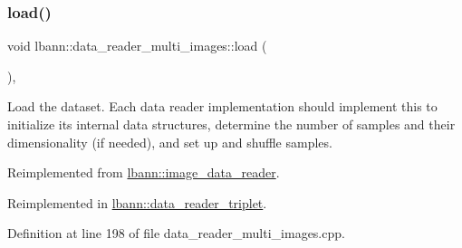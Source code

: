 \subsubsection{\texorpdfstring{load()}{load()}}
{\footnotesize\ttfamily void lbann\+::data\+\_\+reader\+\_\+multi\+\_\+images\+::load (\begin{DoxyParamCaption}{ }\end{DoxyParamCaption})\hspace{0.3cm}{\ttfamily [override]}, {\ttfamily [virtual]}}

Load the dataset. Each data reader implementation should implement this to initialize its internal data structures, determine the number of samples and their dimensionality (if needed), and set up and shuffle samples. 

Reimplemented from \hyperlink{classlbann_1_1image__data__reader_a99cb80242d7d20bc1e8baeaff25ff790}{lbann\+::image\+\_\+data\+\_\+reader}.



Reimplemented in \hyperlink{classlbann_1_1data__reader__triplet_a2601234d6d501df6170c6fb60dfb873e}{lbann\+::data\+\_\+reader\+\_\+triplet}.



Definition at line 198 of file data\+\_\+reader\+\_\+multi\+\_\+images.\+cpp.


